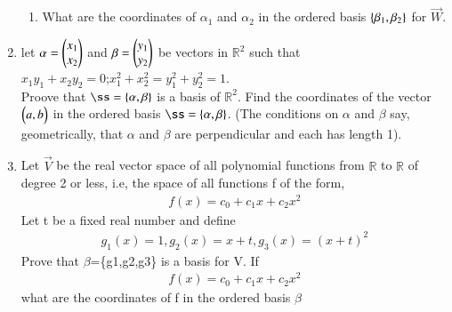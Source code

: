 \begin{enumerate}[label=\thesubsection.\arabic*.,ref=\thesubsection.\theenumi]
\begin{enumerate}[label=\emph{\alph*)}]
	\item What are the coordinates of $\alpha_1$ and $\alpha_2$ in the
		ordered basis $\left\{\beta_1, \beta_2\right\} $ for $\vec{W}$.
\end{enumerate}
\solution

%
\item let $\alpha=\begin{pmatrix}x_1\\x_2\end{pmatrix}$ and $\beta=\begin{pmatrix}y_1\\y_2\end{pmatrix}$ be vectors in $\mathbb{R}^2$ such that\\
$x_1y_1+x_2y_2=0$;\quad $x_1^2+x_2^2=y_1^2+y_2^2=1$.\\
Proove that $\ss=\{\vec{\alpha},\vec{\beta}\}$ is a basis of $\mathbb{R}^2$. Find the coordinates of the vector $\begin{pmatrix}a,b\end{pmatrix}$ in the ordered basis $\ss=\{\vec{\alpha},\vec{\beta}\}$. (The conditions on $\alpha$ and $\beta$ say, geometrically, that $\alpha$ and $\beta$ are perpendicular and each has length 1).
%
\\
\solution

%
\item    Let $\vec{V}$ be the real vector space of all polynomial functions from $\mathbb{R}$ to $\mathbb{R}$ of degree 2 or less, i.e, the space of all functions f of the form,
   \begin{align*}
   f(x)=c_0+c_1x+c_2x^2
   \end{align*} 
   Let t be a fixed real number and define
   \begin{align*}
   g_1(x)=1,        g_2(x)=x+t,         g_3(x)=(x+t)^2
   \end{align*}
   Prove that $\beta$=\{g1,g2,g3\} is a basis for V. If 
   \begin{align*}
   f(x)=c_0+c_1x+c_2x^2
   \end{align*}
   what are the coordinates of f in the ordered basis $\beta$
%
\\
\solution

\end{enumerate}
